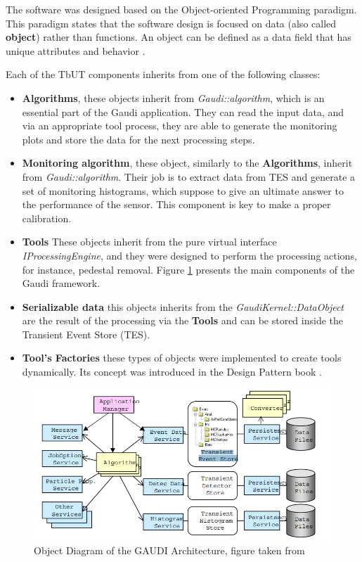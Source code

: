 The software was designed based on the Object-oriented Programming paradigm.   This paradigm states that the software design is focused on data (also called \textbf{object}) rather than functions. An object can be defined as a data field that has unique attributes and behavior \cite{programming_paradigma}. 

Each of the TbUT components inherits from one of the following classes:  

\begin{itemize}
    \item \textbf{Algorithms}, these objects inherit from \textit{Gaudi::algorithm}, which is an essential part of the Gaudi application. They can read the input data, and via an appropriate tool process, they are able to generate the monitoring plots and store the data for the next processing steps. 
    \item \textbf{Monitoring algorithm}, these object, similarly to the \textbf{Algorithms}, inherit from  \textit{Gaudi::algorithm}. Their job is to extract data from TES and generate a set of monitoring histograms, which suppose to give an ultimate answer to the performance of the sensor. This component is key to make a  proper calibration. 
    \item \textbf{Tools} These objects inherit from the pure virtual interface \textit{IProcessingEngine}, and they were designed to perform the processing actions, for instance, pedestal removal. Figure \ref{fig:gaudi flow} presents the main components of the Gaudi framework.   
    \item \textbf{Serializable data} this objects inherits from the \textit{GaudiKernel::DataObject} are the result of the processing via the \textbf{Tools} and can be stored inside the Transient Event Store (TES). 
    \item \textbf{ Tool's Factories} these types of objects were implemented to create tools dynamically. Its concept was introduced in the Design Pattern book \cite{DesignPatterns}. 
\end{itemize}

\begin{figure}[h]
\centering
\includegraphics{figures/Gaudi.png}
\caption{Object Diagram of the GAUDI Architecture, figure taken from \cite{Gaudi}}
\label{fig:gaudi flow}
\end{figure}


